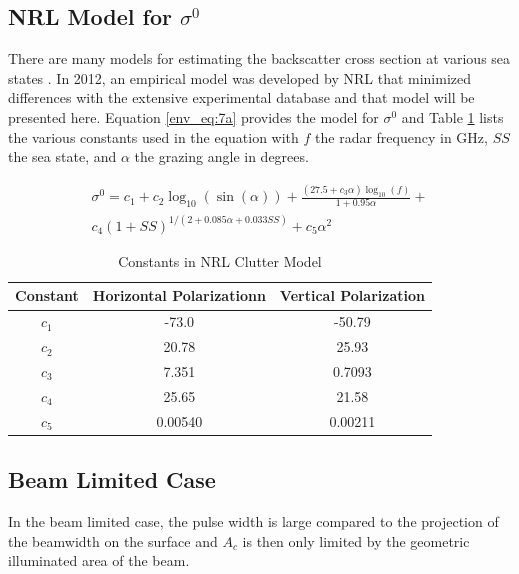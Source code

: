 \subsection{NRL Model for $\sigma^0$}
There are many models for estimating the backscatter cross section at various sea states \cite{blake_radar} \cite{richards_radar} \cite{nathanson_radar}. In 2012, an empirical model was developed by NRL that minimized differences with the extensive experimental database \cite{gregers-hansen_clutter} and that model will be presented here. Equation \ref{env_eq:7a} provides the model for $\sigma^0$ and Table \ref{env_tab:0} lists the various constants used in the equation with $f$ the radar frequency in GHz, $SS$ the sea state, and $\alpha$ the grazing angle in degrees.

\begin{equation}
\begin{gathered}
  \sigma^0 = c_1 + c_2 \log_{10}(\sin(\alpha))+\frac{\left(27.5 + c_3\alpha\right)\log_{10}(f)}{1+0.95\alpha}+\\
  c_4\left(1 + SS \right)^{1/\left(2+0.085\alpha + 0.033SS\right)}
 + c_5\alpha^2 
 \end{gathered}
 \label{env_eq:7a}
  \end{equation}
  
  \begin{table}[H]
  \begin{center}
      \renewcommand{\baselinestretch}{1} \small\normalsize
  \begin{quote}
    \caption[Constants in NRL Clutter Model]{Constants in NRL Clutter Model\label{env_tab:0}}
  \end{quote}
  \begin{tabular} {|c | c | c|}
    \hline
  \bf{Constant} & \bf{Horizontal Polarization}n & \bf{Vertical Polarization} \\ \hline
  $c_1$ & -73.0 & -50.79  \\ \hline
  $c_2$ & 20.78 & 25.93  \\ \hline
  $c_3$ & 7.351 & 0.7093 \\ \hline
  $c_4$ & 25.65 & 21.58  \\ \hline
  $c_5$ & 0.00540 & 0.00211 \\ \hline
\end{tabular}
\end{center}
\end{table}
\renewcommand{\baselinestretch}{2} \small\normalsize
  
\subsection{Beam Limited Case}
In the beam limited case, the pulse width is large compared to the projection of the beamwidth on the surface and $A_c$ is then only limited by the geometric illuminated area of the beam.

